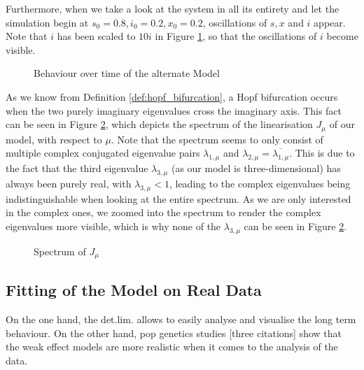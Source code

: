 \documentclass[12pt,a4paper,twoside]{article}
\begin{document}
\newpage

Furthermore, when we take a look at the system in all its entirety and let the simulation begin at $s_0 = 0.8, i_0 = 0.2, x_0 = 0.2$, oscillations of $s, x$ and $i$ appear. Note that $i$ has been scaled to $10i$ in Figure \ref{fig:time_behaviour_my_model}, so that the oscillations of $i$ become visible.

\begin{figure}[h!]%
	\centering
	\caption{Behaviour over time of the alternate Model}
	\label{fig:time_behaviour_my_model}
	\def\svgwidth{350pt}
	
\end{figure}

As we know from Definition \ref{def:hopf_bifurcation}, a Hopf bifurcation occurs when the two purely imaginary eigenvalues cross the imaginary axis. This fact can be seen in Figure \ref{fig:eigenvalue_diagram_hopf}, which depicts the spectrum of the linearisation $J_\mu$ of our model, with respect to $\mu$. Note that the spectrum seems to only consist of multiple complex conjugated eigenvalue pairs $\lambda_{1,\mu}$ and $\lambda_{2,\mu} = \overline{\lambda_{1,\mu}}$. This is due to the fact that the third eigenvalue $\lambda_{3,\mu}$ (as our model is three-dimensional) has always been purely real, with $\lambda_{3,\mu} < 1$, leading to the complex eigenvalues being indistinguishable when looking at the entire spectrum. As we are only interested in the complex ones, we zoomed into the spectrum to render the complex eigenvalues more visible, which is why none of the $\lambda_{3,\mu}$ can be seen in Figure \ref{fig:eigenvalue_diagram_hopf}.

\begin{figure}[h!]
	\centering
	\caption{Spectrum of $J_\mu$}
	\label{fig:eigenvalue_diagram_hopf}
	\def\svgwidth{350pt}
	
\end{figure}


\newpage

\subsection{Fitting of the Model on Real Data}

On the one hand, the det.lim. allows to easily analyse and visualise the long term behaviour. On the other hand, pop genetics studies [three citations] show that the weak effect models are more realistic when it comes to the analysis of the data.
\end{document}
